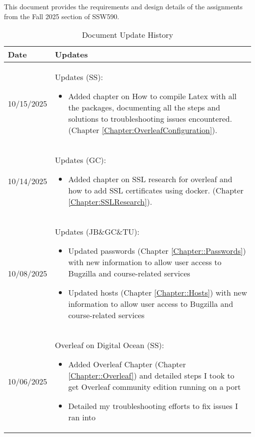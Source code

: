 This document provides the requirements and design details of the
assignments from the Fall 2025 section of SSW590.


\begin{longtable}{|l||p{13.5cm}|}
\caption{Document Update History \label{Table::UpdateHistory}}\\
\hline
\textbf{Date} & \textbf{Updates} \\
\hline 
\endhead

10/15/2025 & Updates (SS):
\begin{itemize}[topsep=0pt,itemsep=0pt,parsep=0pt,partopsep=0pt,leftmargin=12pt]
\item Added chapter on How to compile Latex with all the packages, documenting all the steps and solutions to troubleshooting issues encountered.(Chapter \ref{Chapter:OverleafConfiguration}). 
\end{itemize} 
\\ \hline

10/14/2025 & Updates (GC):
\begin{itemize}[topsep=0pt,itemsep=0pt,parsep=0pt,partopsep=0pt,leftmargin=12pt]
\item Added chapter on SSL research for overleaf and how to add SSL certificates using docker. (Chapter \ref{Chapter:SSLResearch}). 
\end{itemize} 
\\ \hline

10/08/2025 & Updates (JB\&GC\&TU):
\begin{itemize}[topsep=0pt,itemsep=0pt,parsep=0pt,partopsep=0pt,leftmargin=12pt]
\item Updated passwords (Chapter \ref{Chapter::Passwords}) with new information to allow user access to Bugzilla and course-related services 
\item Updated hosts (Chapter \ref{Chapter::Hosts}) with new information to allow user access to Bugzilla and course-related services 
\end{itemize} 
\\ \hline

10/06/2025 & Overleaf on Digital Ocean (SS):
\begin{itemize}[topsep=0pt,itemsep=0pt,parsep=0pt,partopsep=0pt,leftmargin=12pt]
\item Added Overleaf Chapter (Chapter \ref{Chapter::Overleaf}) and detailed steps I took to get Overleaf community edition running on a port 
\item Detailed my troubleshooting efforts to fix issues I ran into 
\end{itemize} 
\\ \hline


\end{longtable}
